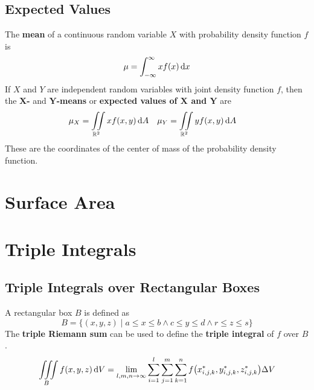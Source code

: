 \documentclass[../Calculus \Roman{3}.tex]{subfiles}
\begin{document}
		\subsection*{Expected Values}
			The \textbf{mean} of a continuous random variable $X$ with probability density function $f$ is
				\[\mu = \int_{-\infty}^\infty xf(x)\,\mathrm{d} x\]
			If $X$ and $Y$ are independent random variables with joint density function $f$, then the \textbf{$\bm{X}$-} and \textbf{$\bm{Y}$-means} or \textbf{expected values of $\bm{X}$ and $\bm{Y}$} are
				\begin{align*}
					\mu_X &= \iint\limits_{\mathbb{R}^2} xf(x, y)\,\mathrm{d} A &
							\mu_Y &= \iint\limits_{\mathbb{R}^2} yf(x, y)\,\mathrm{d} A
				\end{align*}
			These are the coordinates of the center of mass of the probability density function.
	\section{Surface Area}
	\section{Triple Integrals}
		\subsection*{Triple Integrals over Rectangular Boxes}
			A rectangular box $B$ is defined as
				\[B = \{(x, y, z) \mid a \le x \le b \land c \le y \le d \land r \le z \le s\}\]
			The \textbf{triple Riemann sum} can be used to define the \textbf{triple integral} of $f$ over $B$.
				\[\iiint\limits_B f(x, y, z)\,\mathrm{d} V = \lim_{l, m, n \to \infty}\sum_{i = 1}^l\sum_{j = 1}^m\sum_{k = 1}^n f\bigl(x_{i, j, k}^*, y_{i, j, k}^*, z_{i, j, k}^*\bigr)\Delta V\]
\end{document}
